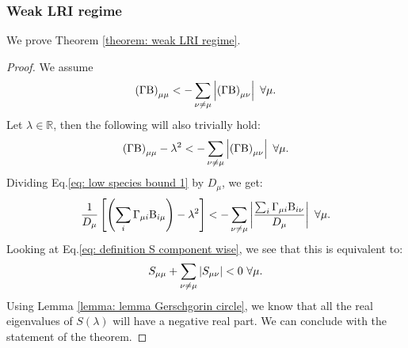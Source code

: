 \documentclass[12pt, titlepage, twoside, openright]{report}
\begin{document}
\subsubsection{Weak LRI regime}\label{sec : weak LRI regime}
We prove Theorem \ref{theorem: weak LRI regime}.
\begin{proof}
We assume
\begin{equation}
\left(\Gamma \text{B}\right)_{\mu\mu} < - \sum_{\nu \neq \mu } \left|{\left(\Gamma \text{B}\right)_{\mu \nu}}\right|  \ \forall \mu.
\end{equation}
Let $\lambda \in \mathbb{R}$, then the following will also trivially hold:
\begin{equation}
  \left(\Gamma\Beta \right)_{\mu\mu} -\lambda^2 < - \sum_{\nu \neq \mu } \abs{\left(\Gamma \Beta\right)_{\mu \nu}} \ \forall \mu. \label{eq: low species bound 1}
\end{equation}
Dividing Eq.\eqref{eq: low species bound 1} by $D_\mu$, we get:
\begin{equation}
\frac{1}{D_\mu}\left[\left(\sum_i \Gamma_{\mu i} \Beta_{i \mu} \right)-{\lambda^2}\right] < - \sum_{\nu \neq \mu } \abs{\frac{\sum_i \Gamma_{\mu i}\Beta_{i\nu}}{D_\mu}} \ \forall \mu.
\end{equation}
Looking at Eq.\eqref{eq: definition S component wise}, we see that this is equivalent to:
\begin{equation}
S_{\mu \mu} + \sum_{\nu \neq \mu} \left|{S_{\mu \nu}}\right| < 0\ \forall \mu.
\end{equation}
Using Lemma \ref{lemma: lemma Gerschgorin circle}, we know that all the real eigenvalues of $S(\lambda)$ will have a negative real part.
We can conclude with the statement of the theorem.
\end{proof}

\normalfont
\end{document}

